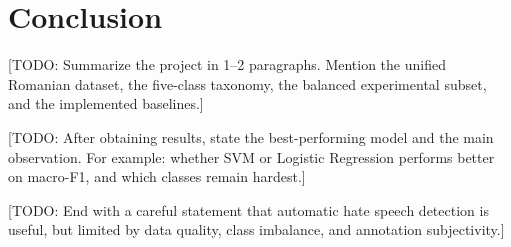 \section{Conclusion}
\label{sec:conclusion}

[TODO: Summarize the project in 1--2 paragraphs. Mention the unified Romanian dataset, the five-class taxonomy, the balanced experimental subset, and the implemented baselines.]

[TODO: After obtaining results, state the best-performing model and the main observation. For example: whether SVM or Logistic Regression performs better on macro-F1, and which classes remain hardest.]

[TODO: End with a careful statement that automatic hate speech detection is useful, but limited by data quality, class imbalance, and annotation subjectivity.]
